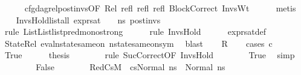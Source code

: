 \begin{isabellebody}
\ \ \ \ \isamarkupfalse%
\ cfg{\isacharunderscore}{\kern0pt}dag{\isacharunderscore}{\kern0pt}rel{\isacharunderscore}{\kern0pt}post{\isacharunderscore}{\kern0pt}invs{\isacharbrackleft}{\kern0pt}OF\ Rel\ refl\ refl\ refl\ BlockCorrect{\isacharbrackright}{\kern0pt}\ InvsWt\isanewline
\ \ \ \ \isamarkupfalse%
\ metis\isanewline
\ \ \isamarkupfalse%
\ InvsHold{}{\isacharcolon}{\kern0pt}{\isachardoublequoteopen}list{\isacharunderscore}{\kern0pt}all\ {\isacharparenleft}{\kern0pt}expr{\isacharunderscore}{\kern0pt}sat\ {\isasymLambda}\ {\isasymGamma}\ {\isasymOmega}\ ns{}{\isacharparenright}{\kern0pt}\ post{\isacharunderscore}{\kern0pt}invs{\isachardoublequoteclose}\ \isanewline
\ \ \ \ \isamarkupfalse%
\ {\isacharparenleft}{\kern0pt}rule\ List{\isachardot}{\kern0pt}List{\isachardot}{\kern0pt}list{\isachardot}{\kern0pt}pred{\isacharunderscore}{\kern0pt}mono{\isacharunderscore}{\kern0pt}strong{\isacharparenright}{\kern0pt}\isanewline
\ \ \ \ \isamarkupfalse%
\ {\isacharparenleft}{\kern0pt}rule\ InvsHold{}{\isacharparenright}{\kern0pt}\isanewline
\ \ \ \ \isamarkupfalse%
\ expr{\isacharunderscore}{\kern0pt}sat{\isacharunderscore}{\kern0pt}def\isanewline
\ \ \ \ \isamarkupfalse%
\ StateRel\ eval{\isacharunderscore}{\kern0pt}nstate{\isacharunderscore}{\kern0pt}same{\isacharunderscore}{\kern0pt}on{\isacharparenleft}{\kern0pt}{}{\isacharparenright}{\kern0pt}\ nstate{\isacharunderscore}{\kern0pt}same{\isacharunderscore}{\kern0pt}on{\isacharunderscore}{\kern0pt}sym\ \isamarkupfalse%
\ blast\isanewline
\ \ \isamarkupfalse%
\ R\isanewline
\ \ \isamarkupfalse%
\ {\isacharparenleft}{\kern0pt}cases\ c{\isacharparenright}{\kern0pt}\isanewline
\ \ \ \ \isamarkupfalse%
\ True\isanewline
\ \ \ \ \isamarkupfalse%
\ {\isacharquery}{\kern0pt}thesis\isanewline
\ \ \ \ \ \ \isamarkupfalse%
\ {\isacharparenleft}{\kern0pt}rule\ SucCorrect{\isacharbrackleft}{\kern0pt}OF\ InvsHold{}{\isacharbrackright}{\kern0pt}{\isacharparenright}{\kern0pt}\isanewline
\ \ \ \ \ \ \isamarkupfalse%
\ True\ \isamarkupfalse%
\ simp\isanewline
\ \ \isamarkupfalse%
\isanewline
\ \ \ \ \isamarkupfalse%
\ False\isanewline
\ \ \ \ \ \ \isamarkupfalse%
\ RedCs{\isacharcolon}{\kern0pt}{\isachardoublequoteopen}{\isacharparenleft}{\kern0pt}M{\isacharcomma}{\kern0pt}{\isasymLambda}{\isacharcomma}{\kern0pt}{\isasymGamma}{\isacharcomma}{\kern0pt}{\isasymOmega}\ {\isasymturnstile}\ {\isasymlangle}cs{\isacharcomma}{\kern0pt}Normal\ ns{}{\isasymrangle}\ {\isacharbrackleft}{\kern0pt}{\isasymrightarrow}{\isacharbrackright}{\kern0pt}\ Normal\ ns{}{\isacharparenright}{\kern0pt}{\isachardoublequoteclose}\isanewline

\end{isabellebody}
